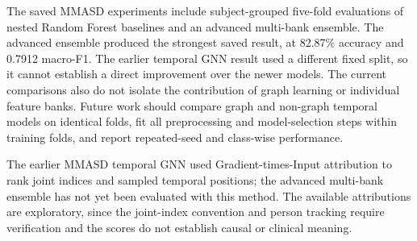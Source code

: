 \documentclass[a4paper,12pt]{report}
\begin{document}
The saved MMASD experiments include subject-grouped five-fold evaluations of nested Random Forest baselines and an advanced multi-bank ensemble. The advanced ensemble produced the strongest saved result, at 82.87\% accuracy and 0.7912 macro-F1. The earlier temporal GNN result used a different fixed split, so it cannot establish a direct improvement over the newer models. The current comparisons also do not isolate the contribution of graph learning or individual feature banks. Future work should compare graph and non-graph temporal models on identical folds, fit all preprocessing and model-selection steps within training folds, and report repeated-seed and class-wise performance.

The earlier MMASD temporal GNN used Gradient-times-Input attribution to rank joint indices and sampled temporal positions; the advanced multi-bank ensemble has not yet been evaluated with this method. The available attributions are exploratory, since the joint-index convention and person tracking require verification and the scores do not establish causal or clinical meaning.
\end{document}
